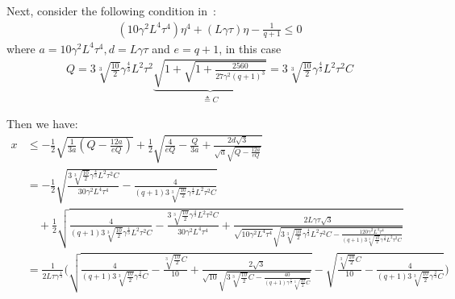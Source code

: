 Next, consider the following condition in~\cite{haddadpour2020federated}: 
\begin{align}
    \left(10\gamma^2L^4\tau^4\right)\eta^4+\left(L\gamma\tau\right)\eta-\frac{1}{q+1}\leq 0
\end{align}
where $a=10\gamma^2L^4\tau^4, d=L\gamma\tau$ and $e=q+1$, in this case 
\begin{align}
    Q=3\sqrt[3]{\frac{10}{2}}\gamma^{\frac{4}{3}} L^2\tau^2\underbrace{\sqrt{1+\sqrt{1+\frac{2560}{27\gamma^2(q+1)^3}}}}_{\triangleq C}=3\sqrt[3]{\frac{10}{2}}\gamma^{\frac{4}{3}} L^2\tau^2 C
\end{align}

Then we have:
\begin{align}
    x&\leq -\frac{1}{2}\sqrt{\frac{1}{3a}\left(Q-\frac{12a}{eQ}\right)}+\frac{1}{2}\sqrt{\frac{4}{eQ}-\frac{Q}{3a}+\frac{2d\sqrt{3}}{\sqrt{a}\sqrt{Q-\frac{12a}{e Q}}}}\nonumber\\
    &=-\frac{1}{2}\sqrt{\frac{3\sqrt[3]{\frac{10}{2}}\gamma^{\frac{4}{3}} L^2\tau^2 C}{30\gamma^2L^4\tau^4}-\frac{4}{(q+1)3\sqrt[3]{\frac{10}{2}}\gamma^{\frac{4}{3}} L^2\tau^2 C}}\nonumber\\
    &\quad+\frac{1}{2}\sqrt{\frac{4}{(q+1)3\sqrt[3]{\frac{10}{2}}\gamma^{\frac{4}{3}} L^2\tau^2 C}-\frac{3\sqrt[3]{\frac{10}{2}}\gamma^{\frac{4}{3}} L^2\tau^2 C}{30\gamma^2L^4\tau^4}+\frac{2L\gamma\tau\sqrt{3}}{\sqrt{10\gamma^2L^4\tau^4}\sqrt{3\sqrt[3]{\frac{10}{2}}\gamma^{\frac{4}{3}} L^2\tau^2 C-\frac{120 \gamma^2L^4\tau^4}{(q+1) 3\sqrt[3]{\frac{10}{2}}\gamma^{\frac{4}{3}} L^2\tau^2 C}}}}\nonumber\\
    &=\frac{1}{2L\tau\gamma^{\frac{1}{3}}}\Big(\sqrt{\frac{4}{(q+1)3\sqrt[3]{\frac{10}{2}}\gamma^{\frac{2}{3}} C}-\frac{\sqrt[3]{\frac{10}{2}} C}{10}+\frac{2\sqrt{3}}{\sqrt{10}\sqrt{3\sqrt[3]{\frac{10}{2}} C-\frac{40 }{(q+1)\gamma^{\frac{2}{3}} \sqrt[3]{\frac{10}{2}} C}}}}-\sqrt{\frac{\sqrt[3]{\frac{10}{2}} C}{10}-\frac{4}{(q+1)3\sqrt[3]{\frac{10}{2}}\gamma^{\frac{2}{3}} C}}\Big)\nonumber\\
\end{align}
